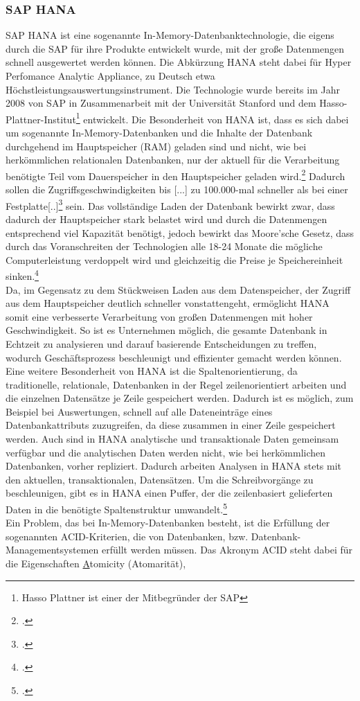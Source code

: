 \subsubsection{SAP HANA}
\label{kap:HANA}
SAP HANA ist eine sogenannte \glqq{}In-Memory\grqq{}-Datenbanktechnologie, die eigens durch die SAP für ihre Produkte entwickelt wurde, mit der große Datenmengen schnell ausgewertet werden können. Die Abkürzung HANA steht dabei für \glqq{}Hyper Perfomance Analytic Appliance\grqq{}, zu Deutsch etwa \glqq{}Höchstleistungsauswertungsinstrument\grqq{}. Die Technologie wurde bereits im Jahr 2008 von SAP in Zusammenarbeit mit der Universität Stanford und dem Hasso-Plattner-Institut\footnote{Hasso Plattner ist einer der Mitbegründer der SAP} entwickelt. Die Besonderheit von HANA ist, dass es sich dabei um sogenannte \glqq{}In-Memory-Datenbanken\grqq{} und die Inhalte der Datenbank durchgehend im Hauptspeicher (RAM) geladen sind und nicht, wie bei herkömmlichen relationalen Datenbanken, nur der aktuell für die Verarbeitung benötigte Teil vom Dauerspeicher in den Hauptspeicher geladen wird.\footcite[Vgl.][]{was-hana} Dadurch sollen die Zugriffsgeschwindigkeiten bis \glqq{}[...] zu 100.000-mal schneller als bei einer Festplatte[..]\grqq{}\footcite[Vgl.][]{rz10-hana} sein. Das vollständige Laden der Datenbank bewirkt zwar, dass dadurch der Hauptspeicher stark belastet wird und durch die Datenmengen entsprechend viel Kapazität benötigt, jedoch bewirkt das Moore'sche Gesetz, dass durch das Voranschreiten der Technologien alle 18-24 Monate die mögliche Computerleistung verdoppelt wird und gleichzeitig die Preise je Speichereinheit sinken.\footcite[Vgl.][]{mooresches}\\ Da, im Gegensatz zu dem Stückweisen Laden aus dem Datenspeicher, der Zugriff aus dem Hauptspeicher deutlich schneller vonstattengeht, ermöglicht HANA somit eine verbesserte Verarbeitung von großen Datenmengen mit hoher Geschwindigkeit. So ist es Unternehmen möglich, die gesamte Datenbank in Echtzeit zu analysieren und darauf basierende Entscheidungen zu treffen, wodurch Geschäftsprozess beschleunigt und effizienter gemacht werden können. Eine weitere Besonderheit von HANA ist die Spaltenorientierung, da traditionelle, relationale, Datenbanken in der Regel zeilenorientiert arbeiten und die einzelnen Datensätze je Zeile gespeichert werden. Dadurch ist es möglich, zum Beispiel bei Auswertungen, schnell auf alle Dateneinträge eines Datenbankattributs zuzugreifen, da diese zusammen in einer Zeile gespeichert werden. Auch sind in HANA analytische und transaktionale Daten gemeinsam verfügbar und die analytischen Daten werden nicht, wie bei herkömmlichen Datenbanken, vorher repliziert. Dadurch arbeiten Analysen in HANA stets mit den aktuellen, transaktionalen, Datensätzen. Um die Schreibvorgänge zu beschleunigen, gibt es in HANA einen Puffer, der die zeilenbasiert gelieferten Daten in die benötigte Spaltenstruktur umwandelt.\footcite[Vgl.][]{was-hana}\\Ein Problem, das bei In-Memory-Datenbanken besteht, ist die Erfüllung der sogenannten ACID-Kriterien, die von Datenbanken, bzw. Datenbank-Managementsystemen erfüllt werden müssen. Das Akronym \glqq{}ACID\grqq{} steht dabei für die Eigenschaften \underline{A}tomicity (Atomarität), 